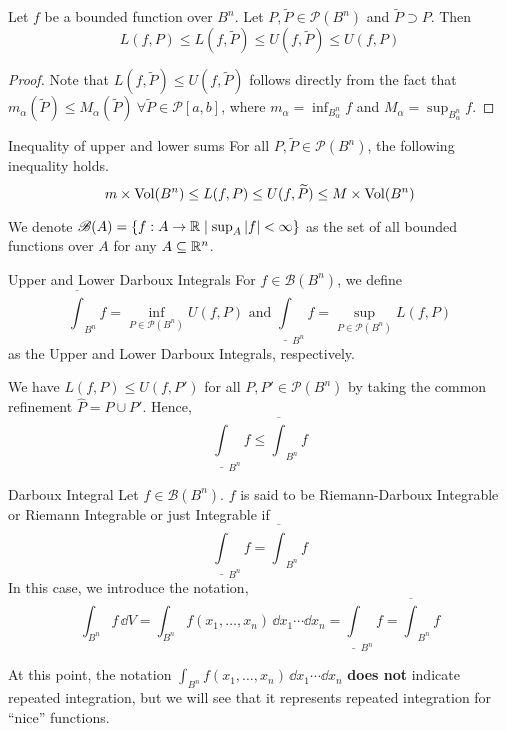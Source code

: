 \documentclass[../Analysis-3.tex]{subfiles}
\begin{document}
\begin{Thm}{}{}
  Let $f$ be a bounded function over $B^n$. Let $P, \widetilde{P} \in \mathscr{P}(B^n)$ and $\widetilde{P} \supset P$. Then
  \[  L(f,P) \leq L(f, \widetilde{P}) \leq U(f,\widetilde{P}) \leq U(f,P)  \]
\end{Thm}

\begin{proof}
  Note that $L(f, \widetilde{P}) \leq U(f,\widetilde{P})$ follows directly from the fact that $m_\alpha (\widetilde{P}) \leq M_\alpha (\widetilde{P})\ \forall \widetilde{P} \in \mathscr{P}[a,b]$, where $m_\alpha = \inf_{B^n_\alpha} f$ and $M_\alpha = \sup_{B_\alpha ^n} f$.
\end{proof}


\begin{Cor}{Inequality of upper and lower sums}{}
  For all $ P, \widetilde{P} \in \mathscr{P}(B^n) $, the following inequality holds.
  \[  m \times \operatorname{Vol}(B^n) \leq L(f,P) \leq U(f, \widetilde{P}) \leq M \times \operatorname{Vol}(B^n)  \]
\end{Cor}

We denote $ \mathscr{B}(A) = \{f:A \to \mathbb{R} \mid \sup_A \abs{f} < \infty\} $ as the set of all bounded functions over $ A $ for any $ A \subseteq \mathbb{R}^n $.

\begin{Def}{Upper and Lower Darboux Integrals}{}
  For $f \in \mathscr{B}(B^n)$, we define
  \[  \overline{\int}_{B^n} f = \inf_{P \in \mathscr{P}(B^n)} U(f,P) \text{  and  } \underline{\int}_{B^n} f = \sup_{P \in \mathscr{P}(B^n)} L(f,P)  \]
  as the Upper and Lower Darboux Integrals, respectively.
\end{Def}

We have $L(f, P) \leq U(f, P')$ for all $P, P' \in \mathscr{P}(B^n)$ by taking the common refinement $\widehat{P} = P \cup P'$. Hence,
\[
  \underline{\int}_{B^n} f \leq \overline{\int}_{B^n} f
\]

\begin{Def}{Darboux Integral}{}
  Let \( f \in \mathscr{B}(B^n) \). \( f \) is said to be Riemann-Darboux Integrable or Riemann Integrable or just Integrable if
  \[
    \underline{\int}_{B^n} f = \overline{\int}_{B^n} f
  \]
  In this case, we introduce the notation,
  \[
    \int_{B^n} f \, \dd V = \int_{B^n} f(x_1, \dots, x_n) \, \dd x_1 \cdots \dd x_n = \underline{\int}_{B^n} f = \overline{\int}_{B^n} f
  \]
\end{Def}
At this point, the notation $\displaystyle\int_{B^n} f(x_1, \dots, x_n) \, \dd x_1 \cdots \dd x_n$ \textbf{does not} indicate repeated integration, but we will see that it represents repeated integration for ``nice'' functions.
\end{document}
